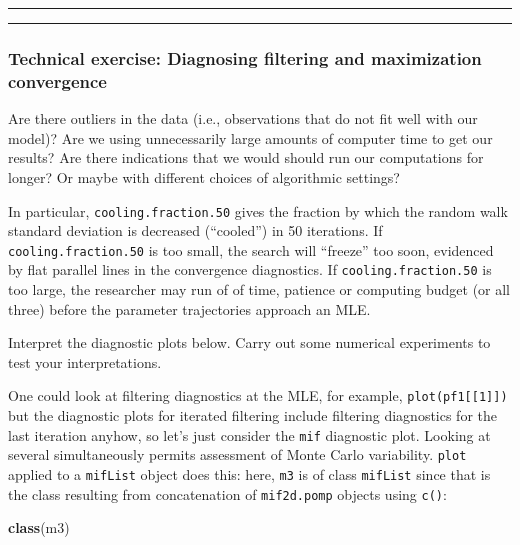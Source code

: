 \documentclass[]{article}
\newenvironment{Shaded}{\begin{snugshade}}{\end{snugshade}}
\newcommand{\KeywordTok}[1]{\textcolor[rgb]{0.13,0.29,0.53}{\textbf{#1}}}
\newcommand{\NormalTok}[1]{#1}
\begin{document}
\begin{center}\rule{0.5\linewidth}{\linethickness}\end{center}

\begin{center}\rule{0.5\linewidth}{\linethickness}\end{center}

\subsubsection{Technical exercise: Diagnosing filtering and maximization
convergence}\label{technical-exercise-diagnosing-filtering-and-maximization-convergence}

Are there outliers in the data (i.e., observations that do not fit well
with our model)? Are we using unnecessarily large amounts of computer
time to get our results? Are there indications that we would should run
our computations for longer? Or maybe with different choices of
algorithmic settings?

In particular, \texttt{cooling.fraction.50} gives the fraction by which
the random walk standard deviation is decreased (``cooled'') in 50
iterations. If \texttt{cooling.fraction.50} is too small, the search
will ``freeze'' too soon, evidenced by flat parallel lines in the
convergence diagnostics. If \texttt{cooling.fraction.50} is too large,
the researcher may run of of time, patience or computing budget (or all
three) before the parameter trajectories approach an MLE.

Interpret the diagnostic plots below. Carry out some numerical
experiments to test your interpretations.

One could look at filtering diagnostics at the MLE, for example,
\texttt{plot(pf1{[}{[}1{]}{]})} but the diagnostic plots for iterated
filtering include filtering diagnostics for the last iteration anyhow,
so let's just consider the \texttt{mif} diagnostic plot. Looking at
several simultaneously permits assessment of Monte Carlo variability.
\texttt{plot} applied to a \texttt{mifList} object does this: here,
\texttt{m3} is of class \texttt{mifList} since that is the class
resulting from concatenation of \texttt{mif2d.pomp} objects using
\texttt{c()}:

\begin{Shaded}
\begin{Highlighting}[]
\KeywordTok{class}\NormalTok{(m3)}
\end{Highlighting}
\end{Shaded}
\end{document}
